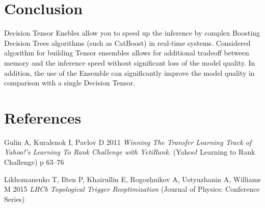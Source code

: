 \documentclass[a4paper]{jpconf}
\begin{document}
\section{Conclusion}

Decision Tensor Ensbles allow you to speed up the inference by complex Boosting Decision Trees algorithms (such as CatBoost) in real-time systems. Considered algorithm for building Tensor ensembles allows for additional tradeoff between memory and the inference speed without significant loss of the model quality.
In addition, the use of the Ensemble can significantly improve the model quality in comparison with a single Decision Tensor.


\section*{References}
\item Gulin A, Kuralenok I, Pavlov D 2011 {\it Winning The Transfer Learning Track of Yahoo!'s Learning To Rank Challenge with YetiRank.} (Yahoo! Learning to Rank Challenge) p 63--76
\item Likhomanenko T, Ilten P, Khairullin E, Rogozhnikov A, Ustyuzhanin A, Williams M 2015 {\it LHCb Topological Trigger Reoptimization} (Journal of Physics: Conference Series)
\endnumrefs
\end{document}
